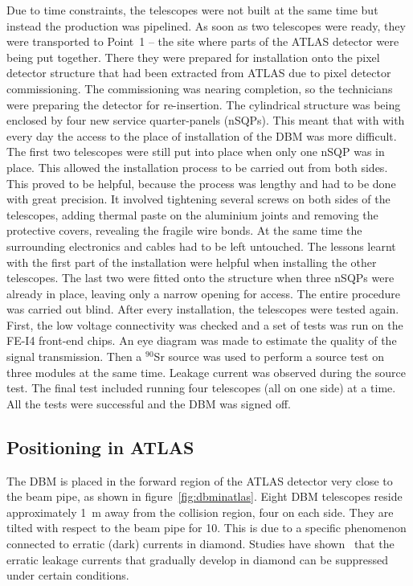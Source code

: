 Due to time constraints, the telescopes were not built at the same time but instead the production was pipelined. As soon as two telescopes were ready, they were transported to Point~1 -- the site where parts of the ATLAS detector were being put together. There they were prepared for installation onto the pixel detector structure that had been extracted from ATLAS due to pixel detector commissioning. The commissioning was nearing completion, so the technicians were preparing the detector for re-insertion. The cylindrical structure was being enclosed by four new service quarter-panels (nSQPs). This meant that with with every day the access to the place of installation of the DBM was more difficult. The first two telescopes were still put into place when only one nSQP was in place. This allowed the installation process to be carried out from both sides. This proved to be helpful, because the process was lengthy and had to be done with great precision. It involved tightening several screws on both sides of the telescopes, adding thermal paste on the aluminium joints and removing the protective covers, revealing the fragile wire bonds. At the same time the surrounding electronics and cables had to be left untouched. The lessons learnt with the first part of the installation were helpful when installing the other telescopes. The last two were fitted onto the structure when three nSQPs were already in place, leaving only a narrow opening for access. The entire procedure was carried out blind. After every installation, the telescopes were tested again. First, the low voltage connectivity was checked and a set of tests was run on the FE-I4 front-end chips. An eye diagram was made to estimate the quality of the signal transmission. Then a $^{90}$Sr source was used to perform a source test on three modules at the same time. Leakage current was observed during the source test. The final test included running four telescopes (all on one side) at a time. All the tests were successful and the DBM was signed off.

\subsection{Positioning in ATLAS}
The DBM is placed in the forward region of the ATLAS detector very close to the beam pipe, as shown in figure~\ref{fig:dbminatlas}. Eight DBM telescopes reside approximately 1~m away from the collision region, four on each side. They are tilted with respect to the beam pipe for 10\textdegree. This is due to a specific phenomenon connected to erratic (dark) currents in diamond. Studies have shown~\cite{Mueller:1175553} that the erratic leakage currents that gradually develop in diamond can be suppressed under certain conditions. 

